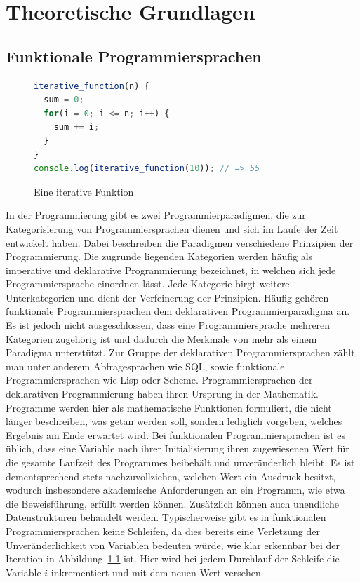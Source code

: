 \chapter{Theoretische Grundlagen}
\label{sec:grundlagen}
\pagestyle{plain}

\section{Funktionale Programmiersprachen}
\label{sec:funktionaleProgrammiersprache}
\begin{figure}[ht]
\centering
\begin{lstlisting}[language=JavaScript]
iterative_function(n) {
  sum = 0;
  for(i = 0; i <= n; i++) {
    sum += i;
  }
}
console.log(iterative_function(10)); // => 55
\end{lstlisting}
\caption{Eine iterative Funktion}\label{fig:iterative-function}
\end{figure}
In der Programmierung gibt es zwei Programmierparadigmen, die zur Kategorisierung von Programmiersprachen dienen und sich im Laufe der Zeit entwickelt haben. %
Dabei beschreiben die Paradigmen verschiedene Prinzipien der Programmierung.
Die zugrunde liegenden Kategorien werden häufig als imperative und deklarative Programmierung bezeichnet, in welchen sich jede Programmiersprache einordnen lässt. Jede Kategorie birgt weitere Unterkategorien und dient der Verfeinerung der Prinzipien.
Häufig gehören funktionale Programmiersprachen dem deklarativen Programmierparadigma an. Es ist jedoch nicht ausgeschlossen, dass eine Programmiersprache mehreren Kategorien zugehörig ist und dadurch die Merkmale von mehr als einem Paradigma unterstützt. Zur Gruppe der deklarativen Programmiersprachen zählt man unter anderem Abfragesprachen wie SQL, sowie funktionale Programmiersprachen wie Lisp oder Scheme.
Programmiersprachen der deklarativen Programmierung haben ihren Ursprung in der Mathematik. Programme werden hier als mathematische Funktionen formuliert, die nicht länger beschreiben, was getan werden soll, sondern lediglich vorgeben, welches Ergebnis am Ende erwartet wird.
Bei funktionalen Programmiersprachen ist es üblich, dass eine Variable nach ihrer Initialisierung ihren zugewiesenen Wert für die gesamte Laufzeit des Programmes beibehält und unveränderlich bleibt. Es ist dementsprechend stets nachzuvollziehen, welchen Wert ein Ausdruck besitzt, wodurch insbesondere akademische Anforderungen an ein Programm, wie etwa die Beweisführung, erfüllt werden können. Zusätzlich können auch unendliche Datenstrukturen behandelt werden.
Typischerweise gibt es in funktionalen Programmiersprachen keine Schleifen, da dies bereits eine Verletzung der Unveränderlichkeit von Variablen bedeuten würde, wie klar erkennbar bei der Iteration in Abbildung~\ref{fig:iterative-function} ist. Hier wird bei jedem Durchlauf der Schleife die Variable $i$ inkrementiert und mit dem neuen Wert versehen.

